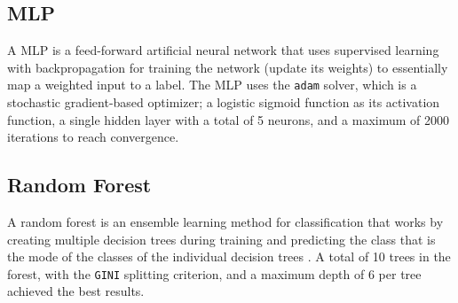 \subsection{MLP}

A MLP is a feed-forward artificial neural network that uses supervised learning with backpropagation for training the network (update its weights) to essentially map a weighted input to a label. The MLP uses the \texttt{adam} solver, which is a stochastic gradient-based optimizer; a logistic sigmoid function as its activation function, a single hidden layer with a total of 5 neurons, and a maximum of 2000 iterations to reach convergence.

\subsection{Random Forest}

A random forest is an ensemble learning method for classification that works by creating multiple decision trees during training and predicting the class that is the mode of the classes of the individual decision trees \cite{data-mining-intro}. A total of 10 trees in the forest, with the \texttt{GINI} splitting criterion, and a maximum depth of 6 per tree achieved the best results.
